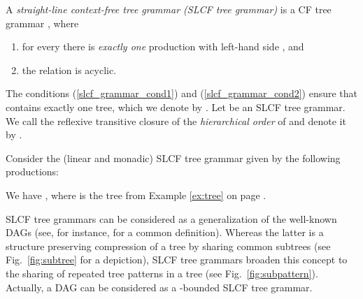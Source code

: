 \documentclass[12pt]{llncs}
\begin{document}
A \emph{straight-line context-free tree grammar (SLCF tree grammar)} 
is a CF tree grammar , where
\begin{enumerate}[(1)]
	\item\label{slcf_grammar_cond1} for every  there is \emph{exactly one} production  with left-hand side , and
	\item\label{slcf_grammar_cond2} the relation  is acyclic.
\end{enumerate}
The conditions (\ref{slcf_grammar_cond1}) and 
(\ref{slcf_grammar_cond2}) ensure that  contains exactly one tree, which we denote by .
Let  be an SLCF tree grammar. 
We call the reflexive transitive closure of 
 the \emph{hierarchical order} 
of  and denote it by .

\begin{example}
	Consider the (linear and monadic) SLCF tree grammar  given by the following productions:
	
	We have , where  is the tree from Example \ref{ex:tree} on page \pageref{ex:tree}.
\end{example}
SLCF tree grammars can be considered as a generalization of the
well-known DAGs (see, for instance, \cite{Lohrey2006complexity} for a
common definition). Whereas the latter is a structure preserving
compression of a tree by sharing common subtrees (see
Fig.~\ref{fig:subtree} for a depiction), SLCF tree grammars broaden
this concept to the sharing of repeated 
tree patterns in a tree (see Fig.~\ref{fig:subpattern}). 
Actually, a DAG can be considered as a -bounded SLCF tree grammar.
\end{document}
